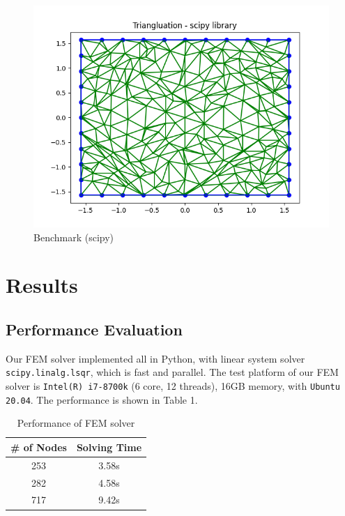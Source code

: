 \documentclass[conference]{IEEEtran}
\begin{document}
    \begin{figure}[h]
        \centering
        \includegraphics[scale=0.4]{../fig/tri_scipy.png}
        \caption{Benchmark (scipy)}
    \end{figure}

\section{Results}
    \subsection{Performance Evaluation}
    Our FEM solver implemented all in Python, with linear system solver \texttt{scipy.linalg.lsqr}, 
    which is fast and parallel. The test platform of our FEM solver is \texttt{Intel(R) i7-8700k} (6 core, 12 threads),
    16GB memory, with \texttt{Ubuntu 20.04}. The performance is shown in Table 1.
    \begin{table}[htbp]
        \centering
        \caption{Performance of FEM solver} 
        \begin{tabular}{|c|c|}  
            \hline
            \# of Nodes & Solving Time\\
            \hline
            253 & 3.58s\\
            \hline
            282 & 4.58s\\
            \hline
            717 & 9.42s\\
            \hline
        \end{tabular}
    \end{table}
\end{document}
